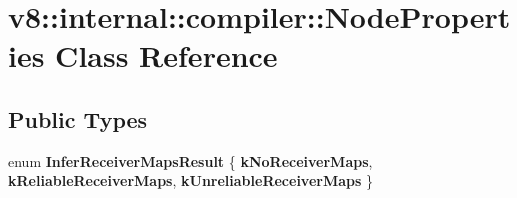 \hypertarget{classv8_1_1internal_1_1compiler_1_1NodeProperties}{}\section{v8\+:\+:internal\+:\+:compiler\+:\+:Node\+Properties Class Reference}
\label{classv8_1_1internal_1_1compiler_1_1NodeProperties}
\subsection*{Public Types}
\begin{DoxyCompactItemize}
\item 
\mbox{\label{classv8_1_1internal_1_1compiler_1_1NodeProperties_aa3c4894dcb5afb297f5124e5b2b68c95}} 
enum {\bfseries Infer\+Receiver\+Maps\+Result} \{ {\bfseries k\+No\+Receiver\+Maps}, 
{\bfseries k\+Reliable\+Receiver\+Maps}, 
{\bfseries k\+Unreliable\+Receiver\+Maps}
 \}
\end{DoxyCompactItemize}
